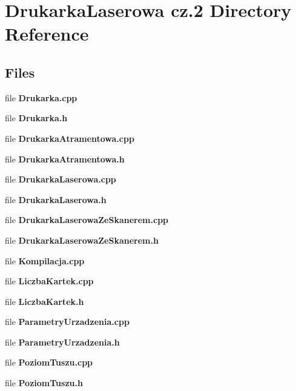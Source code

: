\section{Drukarka\+Laserowa cz.2 Directory Reference}
\label{dir_5b63d3f80671def3ac153ca1a2e8af72}
\subsection*{Files}
\begin{DoxyCompactItemize}
\item 
file \textbf{ Drukarka.\+cpp}
\item 
file \textbf{ Drukarka.\+h}
\item 
file \textbf{ Drukarka\+Atramentowa.\+cpp}
\item 
file \textbf{ Drukarka\+Atramentowa.\+h}
\item 
file \textbf{ Drukarka\+Laserowa.\+cpp}
\item 
file \textbf{ Drukarka\+Laserowa.\+h}
\item 
file \textbf{ Drukarka\+Laserowa\+Ze\+Skanerem.\+cpp}
\item 
file \textbf{ Drukarka\+Laserowa\+Ze\+Skanerem.\+h}
\item 
file \textbf{ Kompilacja.\+cpp}
\item 
file \textbf{ Liczba\+Kartek.\+cpp}
\item 
file \textbf{ Liczba\+Kartek.\+h}
\item 
file \textbf{ Parametry\+Urzadzenia.\+cpp}
\item 
file \textbf{ Parametry\+Urzadzenia.\+h}
\item 
file \textbf{ Poziom\+Tuszu.\+cpp}
\item 
file \textbf{ Poziom\+Tuszu.\+h}
\end{DoxyCompactItemize}

